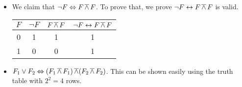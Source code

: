 \begin{exer}[1.4]
    $ $
    \begin{itemize}
        \item
            We claim that $\neg F \Leftrightarrow F \operatorname{\overline{\land}} F$.
            To prove that, we prove $\neg F \leftrightarrow F \operatorname{\overline{\land}} F$ is valid.
            \begin{center}
                \begin{tabular}{ |c|c|c||c| }
                    \hline
                    $F$ & $\neg F$ & $F \operatorname{\overline{\land}} F$ & $\neg F \leftrightarrow F \operatorname{\overline{\land}} F$\\
                    \hline
                    0 & 1 & 1 & 1 \\
                    \hline
                    1 & 0 & 0 & 1 \\
                    \hline
                \end{tabular}
            \end{center}
        \item
            $F_1 \lor F_2 \Leftrightarrow (F_1 \operatorname{\overline{\land}} F_1) \operatorname{\overline{\land}} (F_2 \operatorname{\overline{\land}} F_2)$.
            This can be shown easily using the truth table with $2^2 = 4$ rows.
    \end{itemize}
\end{exer}

